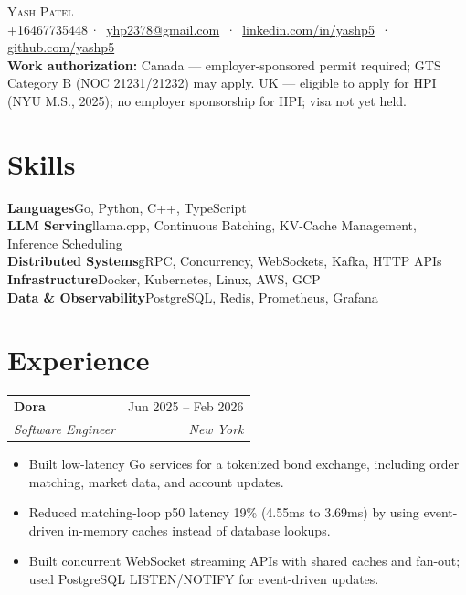 \documentclass[letterpaper,12pt]{article}
\makeatletter
\newcommand{\entry}[4]{%
  \begin{tabularx}{\textwidth}{@{}X@{}r@{}}
    \textbf{#1} & {\small\color{muted}#2} \\
    {\small\itshape #3} & {\small\itshape\color{muted}#4} \\
  \end{tabularx}\vspace{3pt}
}
\newenvironment{bullets}
  {\begin{itemize}[leftmargin=1.1em, itemsep=0pt, topsep=0pt, parsep=0pt, label={\color{muted}\footnotesize\textbullet}]\fontsize{11}{13.0}\selectfont}
  {\end{itemize}\vspace{-3pt}}
\newcommand{\skill}[2]{\textbf{#1}\enspace {\color{muted}·}\enspace #2\\[-1pt]}
\makeatother
\begin{document}
\begin{center}
  {\huge\scshape Yash Patel}\\[1pt]
  {\small
    +16467735448\,{\color{muted}·}\,
    \href{mailto:yhp2378@gmail.com}{yhp2378@gmail.com}
    \,{\color{muted}·}\,
    \href{https://www.linkedin.com/in/yashp5/}{linkedin.com/in/yashp5}
    \,{\color{muted}·}\,
    \href{https://github.com/yashp5}{github.com/yashp5}
  }\\[2pt]
  {\fontsize{9}{10.5}\selectfont\color{muted}
    \textbf{Work authorization:}\enspace
    \ifdefined\CANADA
      Canada --- employer-sponsored permit required; GTS Category B (NOC 21231/21232) may apply.
    \else
      UK --- eligible to apply for HPI (NYU M.S., 2025); no employer sponsorship for HPI; visa not yet held.
    \fi
  }
\end{center}
\vspace{-12pt}

\section{Skills}\vspace{1.2pt}
{\small
\skill{Languages}{Go, Python, C++, TypeScript}
\skill{LLM Serving}{llama.cpp, Continuous Batching, KV-Cache Management, Inference Scheduling}
\skill{Distributed Systems}{gRPC, Concurrency, WebSockets, Kafka, HTTP APIs}
\skill{Infrastructure}{Docker, Kubernetes, Linux, AWS, GCP}
\skill{Data \& Observability}{PostgreSQL, Redis, Prometheus, Grafana}
}

\section{Experience}

\entry{Dora}{Jun 2025 -- Feb 2026}{Software Engineer}{New York}
\begin{bullets}
  \item Built low-latency Go services for a tokenized bond exchange, including order matching, market data, and account updates.
  \item Reduced matching-loop p50 latency 19\% (4.55ms to 3.69ms) by using event-driven in-memory caches instead of database lookups.
  \item Built concurrent WebSocket streaming APIs with shared caches and fan-out; used PostgreSQL LISTEN/NOTIFY for event-driven updates.
\end{bullets}
\end{document}
